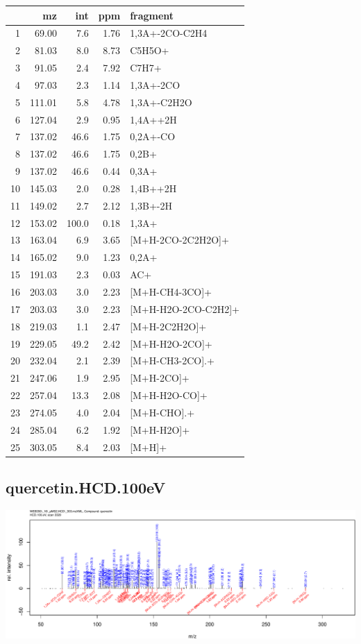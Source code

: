 \documentclass[]{article}
\begin{document}
\begin{table}[ht]
\centering
\begin{tabular}{rrrrl}
  \toprule
 & mz & int & ppm & fragment \\ 
  \midrule
1 & 69.00 & 7.6 & 1.76 & 1,3A+-2CO-C2H4 \\ 
  2 & 81.03 & 8.0 & 8.73 & C5H5O+ \\ 
  3 & 91.05 & 2.4 & 7.92 & C7H7+ \\ 
  4 & 97.03 & 2.3 & 1.14 & 1,3A+-2CO \\ 
  5 & 111.01 & 5.8 & 4.78 & 1,3A+-C2H2O \\ 
  6 & 127.04 & 2.9 & 0.95 & 1,4A++2H \\ 
  7 & 137.02 & 46.6 & 1.75 & 0,2A+-CO \\ 
  8 & 137.02 & 46.6 & 1.75 & 0,2B+ \\ 
  9 & 137.02 & 46.6 & 0.44 & 0,3A+ \\ 
  10 & 145.03 & 2.0 & 0.28 & 1,4B++2H \\ 
  11 & 149.02 & 2.7 & 2.12 & 1,3B+-2H \\ 
  12 & 153.02 & 100.0 & 0.18 & 1,3A+ \\ 
  13 & 163.04 & 6.9 & 3.65 & [M+H-2CO-2C2H2O]+ \\ 
  14 & 165.02 & 9.0 & 1.23 & 0,2A+ \\ 
  15 & 191.03 & 2.3 & 0.03 & AC+ \\ 
  16 & 203.03 & 3.0 & 2.23 & [M+H-CH4-3CO]+ \\ 
  17 & 203.03 & 3.0 & 2.23 & [M+H-H2O-2CO-C2H2]+ \\ 
  18 & 219.03 & 1.1 & 2.47 & [M+H-2C2H2O]+ \\ 
  19 & 229.05 & 49.2 & 2.42 & [M+H-H2O-2CO]+ \\ 
  20 & 232.04 & 2.1 & 2.39 & [M+H-CH3-2CO].+ \\ 
  21 & 247.06 & 1.9 & 2.95 & [M+H-2CO]+ \\ 
  22 & 257.04 & 13.3 & 2.08 & [M+H-H2O-CO]+ \\ 
  23 & 274.05 & 4.0 & 2.04 & [M+H-CHO].+ \\ 
  24 & 285.04 & 6.2 & 1.92 & [M+H-H2O]+ \\ 
  25 & 303.05 & 8.4 & 2.03 & [M+H]+ \\ 
   \bottomrule
\end{tabular}
\end{table}

\clearpage\subsection{quercetin.HCD.100eV}
\includegraphics[width=\textwidth]{WEB350_files/figure-latex/unnamed-chunk-3-30}
\end{document}
